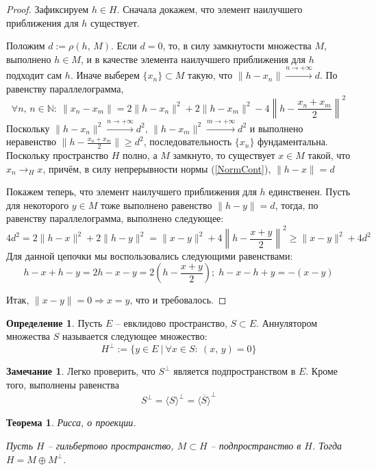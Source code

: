 \documentclass[a4paper,12pt]{article}
\renewcommand{\geq}{\ensuremath{\geqslant}}
\theoremstyle{plain}
\newtheorem{theorem}{Теорема}[section]
\theoremstyle{definition}
\newtheorem{definition}{Определение}[section]
\newtheorem*{note}{Замечание}
\theoremstyle{remark}
\begin{document}
\begin{proof}
	Зафиксируем $h \in H$. Сначала докажем, что элемент наилучшего приближения для $h$ существует.

	Положим $d := \rho(h,\, M)$. Если $d = 0$, то, в силу замкнутости множества $M$, выполнено $h \in M$, и в качестве элемента наилучшего приближения для $h$ подходит сам $h$. Иначе выберем $\{x_n\} \subset M$ такую, что $\|h - x_n\| \overset{n \to +\infty}{\to} d$. По равенству параллелограмма,
	\[
		\forall n,\,n \in \mathbb{N} :\: \|x_n - x_m\| = 2 \|h - x_n\|^2 + 2\|h - x_m\|^2 - 4\left\|h - \frac{x_n + x_m}{2}\right\|^2
	\]
	Поскольку $\|h - x_n\|^2 \overset{n \to +\infty}{\to} d^2,\, \|h - x_m\|^2 \overset{m \to +\infty}{\to} d^2$ и выполнено неравенство $\|h - \frac{x_n + x_m}{2}\| \geq d^2$, последовательность $\{x_n\}$ фундаментальна. Поскольку пространство $H$ полно, а $M$ замкнуто, то существует $x \in M$ такой, что $x_n \to_H x$, причём, в силу непрерывности нормы (\ref{NormCont}), $\|h - x\| = d$

	Покажем теперь, что элемент наилучшего приближения для $h$ единственен. Пусть для некоторого $y \in M$ тоже выполнено равенство $\|h - y\| = d$, тогда, по равенству параллелограмма, выполнено следующее:
	\[
		4d^2= 2\|h - x\|^2 + 2\|h - y\|^2 = \|x - y\|^2 + 4\left\|h - \frac{x + y}{2}\right\|^2 \geq \|x - y\|^2 + 4d^2
	\]
	Для данной цепочки мы воспользовались следующими равенствами:
	\[
		h - x + h - y = 2h - x - y = 2(h - \frac{x + y}{2});\; h - x - h + y = -(x - y)
	\]

	Итак, $\|x - y\| =0 \Rightarrow x = y$, что и требовалось.
\end{proof}

\begin{definition}
	Пусть $E$ -- евклидово пространство, $S \subset E$. Аннулятором множества $S$ называется следующее множество:
	\[
		H^\bot := \{y \in E \:\vert\: \forall x \in S :\: (x,\,y) = 0 \}
	\]
\end{definition}

\begin{note}
  Легко проверить, что $S^\bot$ является подпространством в $E$. Кроме того, выполнены равенства
  \[
    S^\bot = \langle S\rangle^\bot = \overline{\langle S\rangle}^\bot
  \]
\end{note}

\begin{theorem}
	Рисса, о проекции.

	Пусть $H$ -- гильбертово пространство, $M \subset H$ -- подпространство в $H$. Тогда $H = M \oplus M^\bot$.
\end{theorem}
\end{document}
